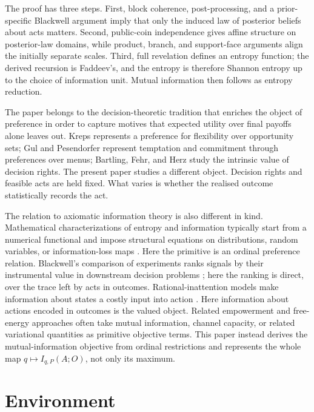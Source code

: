 \documentclass[11pt,a4paper]{article}
\theoremstyle{definition}
\newcommand{\1}{\mathbf 1}
\begin{document}
The proof has three steps.  First, block coherence, post-processing, and a prior-specific Blackwell argument imply that
only the induced law of posterior beliefs about acts matters.  Second, public-coin independence gives affine structure on
posterior-law domains, while product, branch, and support-face arguments align the initially separate scales.  Third,
full revelation defines an entropy function; the derived recursion is Faddeev's, and the entropy is therefore Shannon
entropy up to the choice of information unit.  Mutual information then follows as entropy reduction.

The paper belongs to the decision-theoretic tradition that enriches the object of preference in order to capture motives
that expected utility over final payoffs alone leaves out.  Kreps \cite{Kreps1979} represents a preference for flexibility
over opportunity sets; Gul and Pesendorfer \cite{GulPesendorfer2001} represent temptation and commitment through
preferences over menus; Bartling, Fehr, and Herz \cite{BartlingFehrHerz2014} study the intrinsic value of decision
rights.  The present paper studies a different object.  Decision rights and feasible acts are held fixed.  What varies is
whether the realised outcome statistically records the act.

The relation to axiomatic information theory is also different in kind.  Mathematical characterizations of entropy and
information typically start from a numerical functional and impose structural equations on distributions, random
variables, or information-loss maps \cite{Faddeev1956,BaezFritzLeinster2011}.  Here the primitive is an ordinal
preference relation.  Blackwell's comparison of experiments ranks signals by their instrumental value in downstream
decision problems \cite{Blackwell1953}; here the ranking is direct, over the trace left by acts in outcomes.
Rational-inattention models make information about states a costly input into action \cite{Sims2003,MatejkaMcKay2015}.
Here information about actions encoded in outcomes is the valued object.  Related empowerment and free-energy approaches
often take mutual information, channel capacity, or related variational quantities as primitive objective terms.  This
paper instead derives the mutual-information objective from ordinal restrictions and represents the whole map
$q\mapsto I_{q,P}(A;O)$, not only its maximum.

\section*{Environment}
\end{document}
